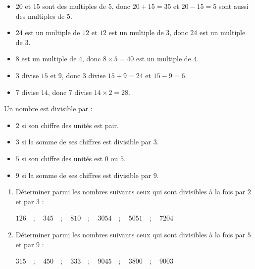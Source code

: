 \documentclass[10pt, a4paper]{article}
\begin{document}
\begin{Exemple}[][5 min]
\begin{itemize}[leftmargin=*,itemsep=0.5pt]
    \item $20$ et $15$ sont des multiples de $5$, donc $20 + 15 = 35$ et $20 - 15 = 5$ sont aussi des multiples de $5$.
    \item $24$ est un multiple de $12$ et $12$ est un multiple de $3$, donc $24$ est un multiple de $3$.
    \item $8$ est un multiple de $4$, donc $8 \times 5 = 40$ est un multiple de $4$.
    \item $3$ divise $15$ et $9$, donc $3$ divise $15 + 9 = 24$ et $15 - 9 = 6$.
    \item $7$ divise $14$, donc $7$ divise $14 \times 2 = 28$.
\end{itemize}
\end{Exemple}

\fi



\begin{Propriete} Un nombre est divisible par :
\begin{itemize}[leftmargin=*,itemsep=0.5pt]
  \item $2$ si son chiffre des unités est pair.
  \item $3$ si la somme de ses chiffres est divisible par $3$.
  \item $5$ si son chiffre des unités est $0$ ou $5$.
  \item $9$ si la somme de ses chiffres est divisible par $9$.
\end{itemize}
\end{Propriete}

\begin{Application}[][15 min]
\begin{enumerate}[leftmargin=*,itemsep=0.5pt]
    \item Déterminer parmi les nombres suivants ceux qui sont divisibles à la fois par $2$ et par $3$ :
\begin{center}
    $126 \quad ; \quad 345 \quad ; \quad 810 \quad ; \quad 3054 \quad ; \quad 5051 \quad ; \quad 7204$
\end{center}
    \item Déterminer parmi les nombres suivants ceux qui sont divisibles à la fois par $5$ et par $9$ :
\begin{center}
    $315 \quad ; \quad 450 \quad ; \quad 333 \quad ; \quad 9045 \quad ; \quad 3800 \quad ; \quad 9003$
\end{center}
\end{enumerate}
\end{Application}
\end{document}
